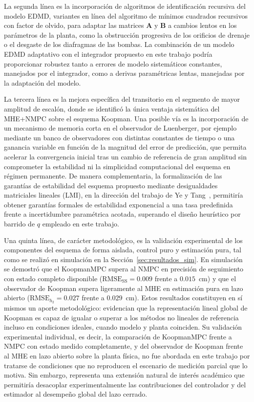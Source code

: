 \documentclass[12pt,letterpaper]{article}
\begin{document}
La segunda línea es la incorporación de algoritmos de
identificación recursiva del modelo EDMD, variantes en línea
del algoritmo de mínimos cuadrados recursivos con factor de
olvido, para adaptar las matrices $\mathbf{A}$ y $\mathbf{B}$
a cambios lentos en los parámetros de la planta, como la
obstrucción progresiva de los orificios de drenaje o el desgaste 
de los diafragmas de las bombas. La combinación de un modelo 
EDMD adaptativo con el integrador propuesto en este trabajo 
podría proporcionar robustez tanto a errores de modelo 
sistemáticos constantes, manejados por el integrador, como
a derivas paramétricas lentas, manejadas por la adaptación
del modelo.

La tercera línea es la mejora específica del transitorio en el 
segmento de mayor amplitud de escalón, donde se identificó la 
única ventaja sistemática del MHE+NMPC sobre el esquema Koopman. 
Una posible vía es la incorporación de un mecanismo de memoria 
corta en el observador de Luenberger, por ejemplo mediante un 
banco de observadores con distintas constantes de tiempo o una 
ganancia variable en función de la magnitud del error de 
predicción, que permita acelerar la convergencia inicial tras un 
cambio de referencia de gran amplitud sin comprometer la 
estabilidad ni la simplicidad computacional del esquema en 
régimen permanente. De manera complementaria, la formalización 
de las garantías de estabilidad del esquema propuesto mediante 
desigualdades matriciales lineales (LMI), en la dirección del 
trabajo de Ye y Tang~\cite{ye2025}, permitiría obtener garantías 
formales de estabilidad exponencial a una tasa predefinida frente 
a incertidumbre paramétrica acotada, superando el diseño 
heurístico por barrido de $q$ empleado en este trabajo.

Una quinta línea, de carácter metodológico, es la validación
experimental de los componentes del esquema de forma aislada,
control puro y estimación pura, tal como se realizó en
simulación en la Sección~\ref{sec:resultados_sim}. En
simulación se demostró que el KoopmanMPC supera al NMPC en
precisión de seguimiento con estado completo disponible
($\mathrm{RMSE}_{\mathrm{SS}} = 0.009$ frente a $0.015$~cm)
y que el observador de Koopman supera ligeramente al MHE en
estimación pura en lazo abierto ($\mathrm{RMSE}_{h_2} =
0.027$ frente a $0.029$~cm). Estos resultados constituyen
en sí mismos un aporte metodológico: evidencian que la
representación lineal global de Koopman es capaz de igualar
o superar a los métodos no lineales de referencia incluso en
condiciones ideales, cuando modelo y planta coinciden.
Su validación experimental individual, es decir, la
comparación de KoopmanMPC frente a NMPC con estado medido
completamente, y del observador de Koopman frente al MHE en
lazo abierto sobre la planta física, no fue abordada en
este trabajo por tratarse de condiciones que no reproducen
el escenario de medición parcial que lo motiva. Sin
embargo, representa una extensión natural de interés
académico que permitiría desacoplar experimentalmente las
contribuciones del controlador y del estimador al desempeño
global del lazo cerrado.
\end{document}
